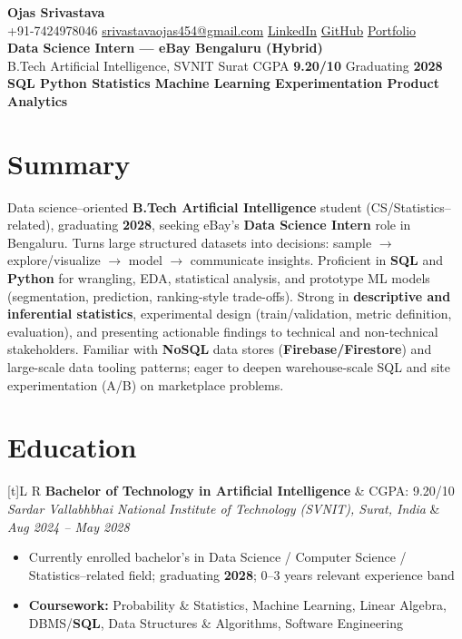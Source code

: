 \documentclass[a4paper,10pt]{article}
\newcommand{\resumeSubheading}[4]{%
  \vspace{0.35mm}
  \noindent
  \begin{tabularx}{\textwidth}[t]{L R}
    \textbf{#1} & #4 \\
    \textit{#3} & \textit{#2} \\
  \end{tabularx}
  \vspace{-0.35mm}%
}
\begin{document}
\selectfont

\begin{center}
  {\LARGE \textbf{Ojas Srivastava}} \\[0.7mm]
  \small
  +91-7424978046 \textbar{}
  \href{mailto:srivastavaojas454@gmail.com}{srivastavaojas454@gmail.com} \textbar{}
  \href{https://linkedin.com/in/ojas-srivastava05}{LinkedIn} \textbar{}
  \href{https://github.com/Ojas-Srivastava05}{GitHub} \textbar{}
  \href{https://ojas-srivastava.vercel.app}{Portfolio} \\[0.25mm]
  \textbf{Data Science Intern --- eBay \textbar{} Bengaluru (Hybrid)} \\[0.15mm]
  B.Tech Artificial Intelligence, SVNIT Surat \textbar{}
  CGPA \textbf{9.20/10} \textbar{}
  Graduating \textbf{2028} \\[0.15mm]
  \textbf{SQL \textbar{} Python \textbar{} Statistics \textbar{} Machine Learning \textbar{} Experimentation \textbar{} Product Analytics}
\end{center}

\vspace{-0.7mm}

\section{Summary}
\small
Data science--oriented \textbf{B.Tech Artificial Intelligence} student (CS/Statistics--related), graduating \textbf{2028}, seeking eBay's \textbf{Data Science Intern} role in Bengaluru. Turns large structured datasets into decisions: sample $\rightarrow$ explore/visualize $\rightarrow$ model $\rightarrow$ communicate insights. Proficient in \textbf{SQL} and \textbf{Python} for wrangling, EDA, statistical analysis, and prototype ML models (segmentation, prediction, ranking-style trade-offs). Strong in \textbf{descriptive and inferential statistics}, experimental design (train/validation, metric definition, evaluation), and presenting actionable findings to technical and non-technical stakeholders. Familiar with \textbf{NoSQL} data stores (\textbf{Firebase/Firestore}) and large-scale data tooling patterns; eager to deepen warehouse-scale SQL and site experimentation (A/B) on marketplace problems.

\section{Education}
\small
\resumeSubheading
  {Bachelor of Technology in Artificial Intelligence}{Aug 2024 -- May 2028}
  {Sardar Vallabhbhai National Institute of Technology (SVNIT), Surat, India}{CGPA: 9.20/10}
\begin{itemize}
  \item Currently enrolled bachelor's in Data Science / Computer Science / Statistics--related field; graduating \textbf{2028}; 0--3 years relevant experience band
  \item \textbf{Coursework:} Probability \& Statistics, Machine Learning, Linear Algebra, DBMS/\textbf{SQL}, Data Structures \& Algorithms, Software Engineering
\end{itemize}
\end{document}
